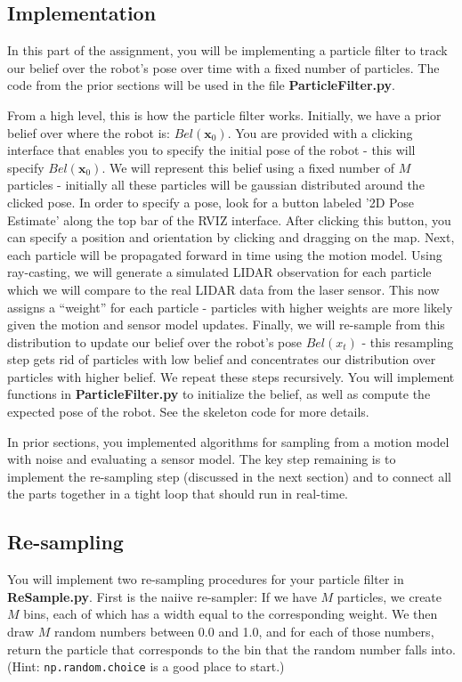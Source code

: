 \documentclass[final]{article}
\begin{document}
\subsection{Implementation}

In this part of the assignment, you will be implementing a particle filter to track our belief over the robot's pose over time with a fixed number of particles. The code from the prior sections will be used in the file \textbf{ParticleFilter.py}. 

From a high level, this is how the particle filter works. Initially, we have a prior belief over where the robot is: $Bel(\mathbf{x}_0)$. You are provided with a clicking interface that enables you to specify the initial pose of the robot - this will specify $Bel(\mathbf{x}_0)$. We will represent this belief using a fixed number of $M$ particles - initially all these particles will be gaussian distributed around the clicked pose. In order to specify a pose, look for a button labeled '2D Pose Estimate' along the top bar of the RVIZ interface. After clicking this button, you  can specify a position and orientation by clicking and dragging on the map. Next, each particle will be propagated forward in time using the motion model. Using ray-casting, we will generate a simulated LIDAR observation for each particle which we will compare to the real LIDAR data from the laser sensor. This now assigns a ``weight'' for each particle - particles with higher weights are more likely given the motion and sensor model updates. Finally, we will re-sample from this distribution to update our belief over the robot's pose $Bel(x_t)$ - this resampling step gets rid of particles with low belief and concentrates our distribution over particles with higher belief. We repeat these steps recursively. You will implement functions in \textbf{ParticleFilter.py} to initialize the belief, as well as compute the expected pose of the robot. See the skeleton code for more details.

In prior sections, you implemented algorithms for sampling from a motion model with noise and evaluating a sensor model. The key step remaining is to implement the re-sampling step (discussed in the next section) and to connect all the parts together in a tight loop that should run in real-time. 


\subsection{Re-sampling}
You will implement two re-sampling procedures for your particle filter in \textbf{ReSample.py}. First is the naiive re-sampler: If we have $M$ particles, we create $M$ bins, each of which has a width equal to the corresponding weight. We then draw $M$ random numbers between 0.0 and 1.0, and for each of those numbers, return the particle that corresponds to the bin that the random number falls into. (Hint: \texttt{np.random.choice} is a good place to start.)
\end{document}
